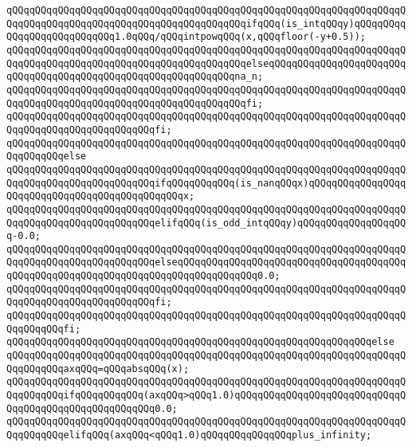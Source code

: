\verb|qQQqqQQqqQQqqQQqqQQqqQQqqQQqqQQqqQQqqQQqqQQqqQQqqQQqqQQqqQQqqQQqqQQqqQQqqQQqqQQqqQQqqQQqqQQqqQQqqQQqqQQqqQQqqQQqifqQQq(is_intqQQqy)qQQqqQQqqQQqqQQqqQQqqQQqqQQq1.0qQQq/qQQqintpowqQQq(x,qQQqfloor(-y+0.5));|\newline
\verb|qQQqqQQqqQQqqQQqqQQqqQQqqQQqqQQqqQQqqQQqqQQqqQQqqQQqqQQqqQQqqQQqqQQqqQQqqQQqqQQqqQQqqQQqqQQqqQQqqQQqqQQqqQQqqQQqelseqQQqqQQqqQQqqQQqqQQqqQQqqQQqqQQqqQQqqQQqqQQqqQQqqQQqqQQqqQQqqQQqna_n;|\newline
\verb|qQQqqQQqqQQqqQQqqQQqqQQqqQQqqQQqqQQqqQQqqQQqqQQqqQQqqQQqqQQqqQQqqQQqqQQqqQQqqQQqqQQqqQQqqQQqqQQqqQQqqQQqqQQqqQQqfi;|\newline
\verb|qQQqqQQqqQQqqQQqqQQqqQQqqQQqqQQqqQQqqQQqqQQqqQQqqQQqqQQqqQQqqQQqqQQqqQQqqQQqqQQqqQQqqQQqqQQqqQQqfi;|\newline
\verb|qQQqqQQqqQQqqQQqqQQqqQQqqQQqqQQqqQQqqQQqqQQqqQQqqQQqqQQqqQQqqQQqqQQqqQQqqQQqqQQqelse|\newline
\verb|qQQqqQQqqQQqqQQqqQQqqQQqqQQqqQQqqQQqqQQqqQQqqQQqqQQqqQQqqQQqqQQqqQQqqQQqqQQqqQQqqQQqqQQqqQQqqQQqifqQQqqQQqqQQq(is_nanqQQqx)qQQqqQQqqQQqqQQqqQQqqQQqqQQqqQQqqQQqqQQqqQQqqQQqx;|\newline
\verb|qQQqqQQqqQQqqQQqqQQqqQQqqQQqqQQqqQQqqQQqqQQqqQQqqQQqqQQqqQQqqQQqqQQqqQQqqQQqqQQqqQQqqQQqqQQqqQQqelifqQQq(is_odd_intqQQqy)qQQqqQQqqQQqqQQqqQQq-0.0;|\newline
\verb|qQQqqQQqqQQqqQQqqQQqqQQqqQQqqQQqqQQqqQQqqQQqqQQqqQQqqQQqqQQqqQQqqQQqqQQqqQQqqQQqqQQqqQQqqQQqqQQqelseqQQqqQQqqQQqqQQqqQQqqQQqqQQqqQQqqQQqqQQqqQQqqQQqqQQqqQQqqQQqqQQqqQQqqQQqqQQqqQQqqQQq0.0;|\newline
\verb|qQQqqQQqqQQqqQQqqQQqqQQqqQQqqQQqqQQqqQQqqQQqqQQqqQQqqQQqqQQqqQQqqQQqqQQqqQQqqQQqqQQqqQQqqQQqqQQqfi;|\newline
\verb|qQQqqQQqqQQqqQQqqQQqqQQqqQQqqQQqqQQqqQQqqQQqqQQqqQQqqQQqqQQqqQQqqQQqqQQqqQQqqQQqfi;|\newline
\verb|qQQqqQQqqQQqqQQqqQQqqQQqqQQqqQQqqQQqqQQqqQQqqQQqqQQqqQQqqQQqqQQqelse|\newline
\verb|qQQqqQQqqQQqqQQqqQQqqQQqqQQqqQQqqQQqqQQqqQQqqQQqqQQqqQQqqQQqqQQqqQQqqQQqqQQqqQQqaxqQQq=qQQqabsqQQq(x);|\newline
\newline
\verb|qQQqqQQqqQQqqQQqqQQqqQQqqQQqqQQqqQQqqQQqqQQqqQQqqQQqqQQqqQQqqQQqqQQqqQQqqQQqqQQqifqQQqqQQqqQQq(axqQQq>qQQq1.0)qQQqqQQqqQQqqQQqqQQqqQQqqQQqqQQqqQQqqQQqqQQqqQQqqQQqqQQq0.0;|\newline
\verb|qQQqqQQqqQQqqQQqqQQqqQQqqQQqqQQqqQQqqQQqqQQqqQQqqQQqqQQqqQQqqQQqqQQqqQQqqQQqqQQqelifqQQq(axqQQq<qQQq1.0)qQQqqQQqqQQqqQQqplus_infinity;|\newline
